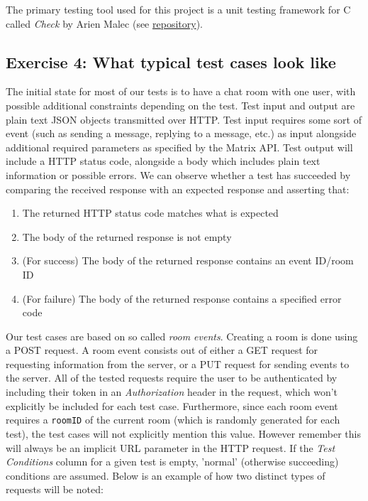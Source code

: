 \documentclass[a4paper]{article}
\begin{document}
	The primary testing tool used for this project is a unit testing framework for C called \textit{Check} by Arien Malec (see \href{https://github.com/libcheck/check}{repository}).
	\subsection{Exercise 4: What typical test cases look like} \label{exercise-4-what-typical-test-cases-look-like}
	The initial state for most of our tests is to have a chat room with one user, with possible additional constraints depending on the test. Test input and output are plain text JSON objects transmitted over HTTP. Test input requires some sort of event (such as sending a message, replying to a message, etc.) as input alongside additional required parameters as specified by the Matrix API. Test output will include a HTTP status code, alongside a body which includes plain text information or possible errors. We can observe whether a test has succeeded by comparing the received response with an expected response and asserting that:
	\begin{enumerate}
		\item The returned HTTP status code matches what is expected
		\item The body of the returned response is not empty
		\item (For success) The body of the returned response contains an event ID/room ID
		\item (For failure) The body of the returned response contains a specified error code
	\end{enumerate}
	
	Our test cases are based on so called \textit{room events}. Creating a room is done using a POST request. A room event consists out of either a GET request for requesting information from the server, or a PUT request for sending events to the server. All of the tested requests require the user to be authenticated by including their token in an \textit{Authorization} header in the request, which won't explicitly be included for each test case. Furthermore, since each room event requires a \texttt{roomID} of the current room (which is randomly generated for each test), the test cases will not explicitly mention this value. However remember this will always be an implicit URL parameter in the HTTP request. If the \textit{Test Conditions} column for a given test is empty, 'normal' (otherwise succeeding) conditions are assumed. Below is an example of how two distinct types of requests will be noted:
	
\end{document}
